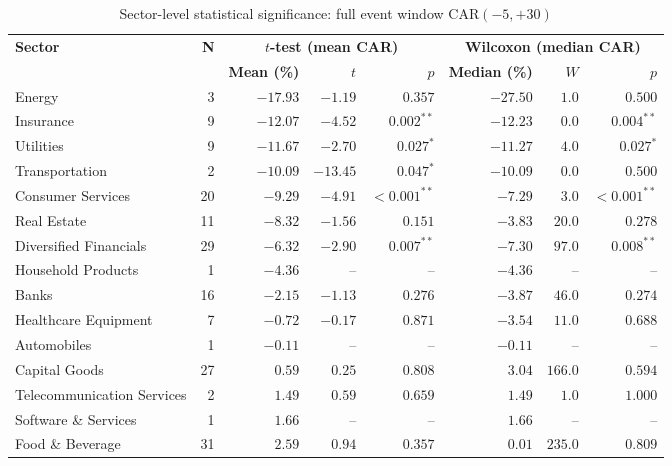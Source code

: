 \documentclass[sigconf, nonacm]{acmart}
\begin{document}
\begin{table}[!htb]
  \centering
  \caption{Sector-level statistical significance: full event window CAR$(-5,+30)$}
  \label{tab:significance}
  \footnotesize
  \begin{tabular}{@{}lrrrrrrr@{}}
    \toprule
    \multirow{2}{*}{\textbf{Sector}} &
    \multirow{2}{*}{\textbf{N}} &
    \multicolumn{3}{c}{\textbf{$t$-test (mean CAR)}} &
    \multicolumn{3}{c}{\textbf{Wilcoxon (median CAR)}} \\
    \cmidrule(lr){3-5}\cmidrule(lr){6-8}
    & & \textbf{Mean (\%)} & \textbf{$t$} & \textbf{$p$} &
        \textbf{Median (\%)} & \textbf{$W$} & \textbf{$p$} \\
    \midrule
    Energy & 3 & $-17.93$ & $-1.19$ & $0.357$ & $-27.50$ & $1.0$ & $0.500$ \\
    Insurance & 9 & $-12.07$ & $-4.52$ & $0.002^{**}$ & $-12.23$ & $0.0$ & $0.004^{**}$ \\
    Utilities & 9 & $-11.67$ & $-2.70$ & $0.027^{*}$ & $-11.27$ & $4.0$ & $0.027^{*}$ \\
    Transportation & 2 & $-10.09$ & $-13.45$ & $0.047^{*}$ & $-10.09$ & $0.0$ & $0.500$ \\
    Consumer Services & 20 & $-9.29$ & $-4.91$ & $<0.001^{**}$ & $-7.29$ & $3.0$ & $<0.001^{**}$ \\
    Real Estate & 11 & $-8.32$ & $-1.56$ & $0.151$ & $-3.83$ & $20.0$ & $0.278$ \\
    Diversified Financials & 29 & $-6.32$ & $-2.90$ & $0.007^{**}$ & $-7.30$ & $97.0$ & $0.008^{**}$ \\
    Household Products & 1 & $-4.36$ & -- & -- & $-4.36$ & -- & -- \\
    Banks & 16 & $-2.15$ & $-1.13$ & $0.276$ & $-3.87$ & $46.0$ & $0.274$ \\
    Healthcare Equipment & 7 & $-0.72$ & $-0.17$ & $0.871$ & $-3.54$ & $11.0$ & $0.688$ \\
    Automobiles & 1 & $-0.11$ & -- & -- & $-0.11$ & -- & -- \\
    Capital Goods & 27 & $ 0.59$ & $ 0.25$ & $0.808$ & $ 3.04$ & $166.0$ & $0.594$ \\
    Telecommunication Services & 2 & $ 1.49$ & $ 0.59$ & $0.659$ & $ 1.49$ & $1.0$ & $1.000$ \\
    Software \& Services & 1 & $ 1.66$ & -- & -- & $ 1.66$ & -- & -- \\
    Food \& Beverage & 31 & $ 2.59$ & $ 0.94$ & $0.357$ & $ 0.01$ & $235.0$ & $0.809$ \\

\end{tabular}
\end{table}
\end{document}
